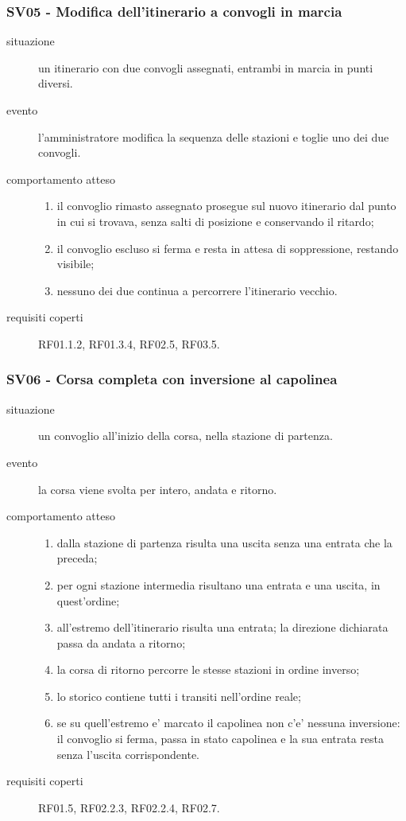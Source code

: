 \documentclass[11pt]{article}
\begin{document}
\subsubsection{SV05 - Modifica dell'itinerario a convogli in marcia}
\label{sec:org1b1b8aa}

\begin{description}
\item[{situazione}] un itinerario con due convogli assegnati, entrambi in marcia in punti diversi.
\item[{evento}] l'amministratore modifica la sequenza delle stazioni e toglie uno dei due convogli.
\item[{comportamento atteso}] \begin{enumerate}
\item il convoglio rimasto assegnato prosegue sul nuovo itinerario dal punto in cui si trovava, senza
salti di posizione e conservando il ritardo;
\item il convoglio escluso si ferma e resta in attesa di soppressione, restando visibile;
\item nessuno dei due continua a percorrere l'itinerario vecchio.
\end{enumerate}
\item[{requisiti coperti}] RF01.1.2, RF01.3.4, RF02.5, RF03.5.
\end{description}
\subsubsection{SV06 - Corsa completa con inversione al capolinea}
\label{sec:org8c07292}

\begin{description}
\item[{situazione}] un convoglio all'inizio della corsa, nella stazione di partenza.
\item[{evento}] la corsa viene svolta per intero, andata e ritorno.
\item[{comportamento atteso}] \begin{enumerate}
\item dalla stazione di partenza risulta una uscita senza una entrata che la preceda;
\item per ogni stazione intermedia risultano una entrata e una uscita, in quest'ordine;
\item all'estremo dell'itinerario risulta una entrata; la direzione dichiarata passa da andata a
ritorno;
\item la corsa di ritorno percorre le stesse stazioni in ordine inverso;
\item lo storico contiene tutti i transiti nell'ordine reale;
\item se su quell'estremo e' marcato il capolinea non c'e' nessuna inversione: il convoglio si ferma,
passa in stato capolinea e la sua entrata resta senza l'uscita corrispondente.
\end{enumerate}
\item[{requisiti coperti}] RF01.5, RF02.2.3, RF02.2.4, RF02.7.
\end{description}
\end{document}
